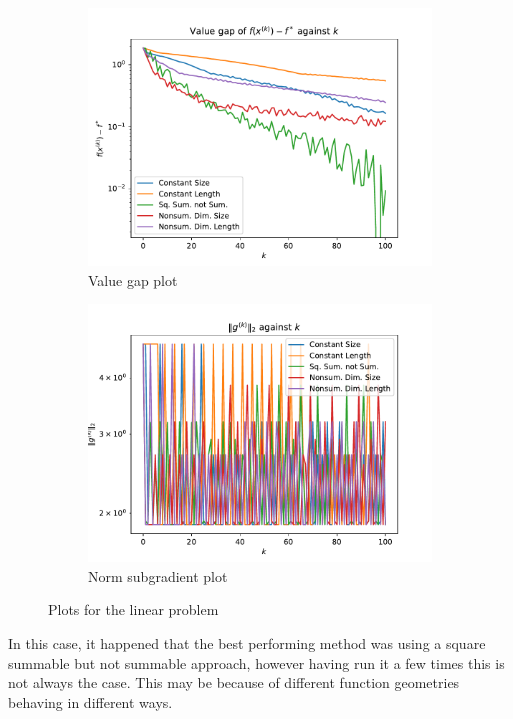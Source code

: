 \documentclass[journal,onecolumn]{IEEEtran}
\begin{document}
\begin{figure}[tbp]
    \centering
    \begin{subfigure}{0.49\textwidth}
        \centering
        \includegraphics[width = \linewidth]{Figures/Linear Example Value Gap.pdf}
        \caption{Value gap plot}
        \label{fig:linear value gap}
    \end{subfigure}
    \begin{subfigure}{0.49\textwidth}
        \centering
        \includegraphics[width = \linewidth]{Figures/Linear Example Subgradient Norm.pdf}
        \caption{Norm subgradient plot}
        \label{fig:linear sg norm}
    \end{subfigure}
    \caption{Plots for the linear problem}
    \label{fig:gd}
\end{figure}
In this case, it happened that the best performing method was using a square summable but not summable approach, however having run it a few times this is not always the case. This may be because of different function geometries behaving in different ways.
\end{document}
